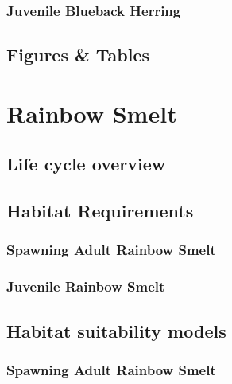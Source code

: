 \documentclass[
]{book}
\begin{document}
\hypertarget{juvenile-blueback-herring-1}{%
\subsection{Juvenile Blueback Herring}\label{juvenile-blueback-herring-1}}

\hypertarget{figures-tables-6}{%
\section{Figures \& Tables}\label{figures-tables-6}}

\hypertarget{rainbow-smelt}{%
\chapter{Rainbow Smelt}\label{rainbow-smelt}}

\hypertarget{life-cycle-overview-7}{%
\section{Life cycle overview}\label{life-cycle-overview-7}}

\hypertarget{habitat-requirements-7}{%
\section{Habitat Requirements}\label{habitat-requirements-7}}

\hypertarget{spawning-adult-rainbow-smelt}{%
\subsection{Spawning Adult Rainbow Smelt}\label{spawning-adult-rainbow-smelt}}

\hypertarget{juvenile-rainbow-smelt}{%
\subsection{Juvenile Rainbow Smelt}\label{juvenile-rainbow-smelt}}

\hypertarget{habitat-suitability-models-7}{%
\section{Habitat suitability models}\label{habitat-suitability-models-7}}

\hypertarget{spawning-adult-rainbow-smelt-1}{%
\subsection{Spawning Adult Rainbow Smelt}\label{spawning-adult-rainbow-smelt-1}}
\end{document}
